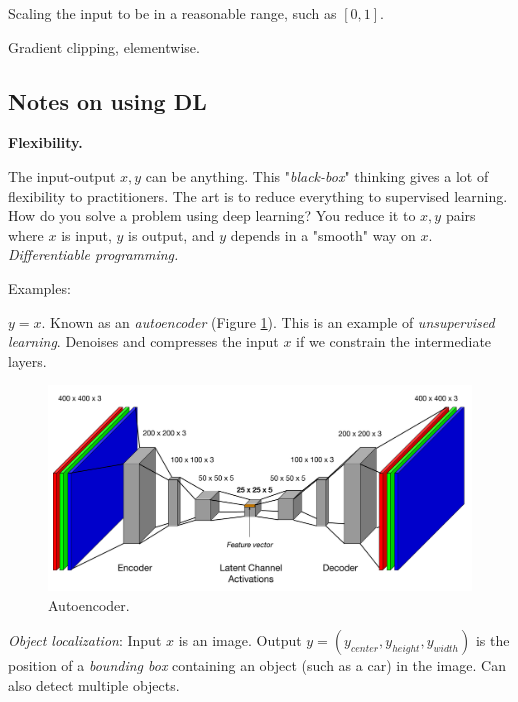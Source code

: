 \documentclass[english]{article}
\begin{document}
\item Scaling the input to be in a reasonable range, such as $[0,1]$.

\item Gradient clipping, elementwise. 


\eenum

\subsection{Notes on using DL}
\benum


\item  {\bf Flexibility.}

The input-output $x,y$ can be anything. This "\emph{black-box}" thinking gives a lot of flexibility to practitioners. The art is to reduce everything to supervised learning. How do you solve a problem using deep learning? You reduce it to $x,y$ pairs where $x$ is input, $y$ is output, and $y$ depends in a "smooth" way on $x$. \emph{Differentiable programming.}

 Examples:

\benum
\item
$y = x$. Known as an \emph{autoencoder} (Figure \ref{ae}). This is an example of \emph{unsupervised learning}. Denoises and compresses the input $x$ if we constrain the intermediate layers. 

\begin{figure}
  \centering
  \includegraphics[scale=0.3]{ae.png}
  \caption{Autoencoder.}
  \label{ae}
\end{figure}




\item 
\emph{Object localization}: Input $x$ is an image. Output $y = (y_{center}, y_{height}, y_{width})$ is the position of a \emph{bounding box} containing an object (such as a car) in the image. Can also detect multiple objects.
 
\end{document}

